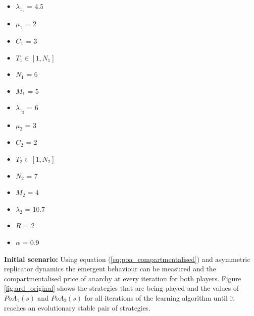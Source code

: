 \begin{multicols}{3}
    \begin{itemize}        
        \item \( \lambda_{1_1} \) = 4.5
        \item \( \mu_1 \) = 2
        \item \( C_1 \) = 3
        \item \( T_1 \in [1, N_1] \) 
        \item \( N_1 \) = 6
        \item \( M_1 \) = 5

        \columnbreak
        \item \( \lambda_{1_2} \) = 6
        \item \( \mu_2 \) = 3
        \item \( C_2 \) = 2
        \item \( T_2 \in [1, N_2] \)
        \item \( N_2 \) = 7
        \item \( M_2 \) = 4
        
        \columnbreak
        \item \( \lambda_2 \) = 10.7
        \item \( R \) = 2
        \item \( \alpha \) = 0.9
    \end{itemize}
\end{multicols}

\textbf{Initial scenario:}
Using equation (\ref{eq:poa_compartmentalised}) and asymmetric replicator 
dynamics the emergent behaviour can be measured and the compartmentalised price 
of anarchy at every iteration for both players.
Figure \ref{fig:ard_original} shows the strategies that are being played and 
the values of \(PoA_1(s)\) and \(PoA_2(s)\) for all iterations of the 
learning algorithm until it reaches an evolutionary stable pair of strategies.

